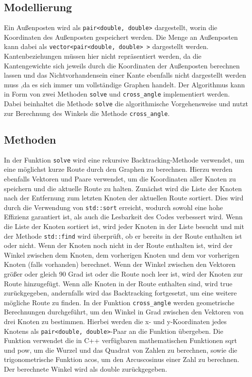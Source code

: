 \documentclass[a4paper,10pt,ngerman]{scrartcl}
\begin{document}
    \subsection{Modellierung}\label{subsec:modellierung}
    Ein Außenposten wird als \texttt{pair<double, double>} dargestellt, worin die Koordinaten des Außenposten gespeichert werden.
    Die Menge an Außenposten kann dabei als \texttt{vector<pair<double, double> >} dargestellt werden.
    Kantenbeziehungen müssen hier nicht repräsentiert werden, da die Kantengewichte sich jeweils durch die Koordinaten der Außenposten berechnen lassen
    und das Nichtvorhandensein einer Kante ebenfalls nicht dargestellt werden muss ,da es sich immer um vollständige Graphen handelt.
    Der Algorithmus kann in Form von zwei Methoden \texttt{solve} und \texttt{cross\_angle} implementiert werden.
    Dabei beinhaltet die Methode \texttt{solve} die algorithmische Vorgehensweise und nutzt zur Berechnung des Winkels die Methode \texttt{cross\_angle}.
    \subsection{Methoden}\label{subsec:methoden}
    In der Funktion \texttt{solve} wird eine rekursive Backtracking-Methode verwendet, um eine möglichst kurze Route durch den Graphen zu berechnen.
    Hierzu werden ebenfalls Vektoren und Paare verwendet, um die Koordinaten aller Knoten zu speichern und die aktuelle Route zu halten.
    Zunächst wird die Liste der Knoten nach der Entfernung zum letzten Knoten der aktuellen Route sortiert.
    Dies wird durch die Verwendung von \texttt{std::sort} erreicht, wodurch sowohl eine hohe Effizienz garantiert ist,
    als auch die Lesbarkeit des Codes verbessert wird.
    Wenn die Liste der Knoten sortiert ist, wird jeder Knoten in der Liste besucht und mit der Methode \texttt{std::find} wird überprüft,
    ob er bereits in der Route enthalten ist oder nicht.
    Wenn der Knoten noch nicht in der Route enthalten ist, wird der Winkel zwischen dem Knoten, dem vorherigen Knoten und dem vor vorherigen Knoten (falls vorhanden) berechnet.
    Wenn der Winkel zwischen den Vektoren größer oder gleich 90 Grad ist oder die Route noch leer ist, wird der Knoten zur Route hinzugefügt.
    Wenn alle Knoten in der Route enthalten sind, wird true zurückgegeben, andernfalls wird das Backtracking fortgesetzt, um eine weitere mögliche Route zu finden.
    \newline
    In der Funktion \texttt{cross\_angle} werden geometrische Berechnungen durchgeführt, um den Winkel in Grad zwischen den Vektoren von drei Knoten zu bestimmen.
    Hierbei werden die x- und y-Koordinaten jedes Knotens als \texttt{pair<double, double>}-Paar an die Funktion übergeben.
    Die Funktion verwendet die in C++ verfügbaren mathematischen Funktionen sqrt und pow, um die Wurzel und das Quadrat von Zahlen zu berechnen,
    sowie die trigonometrische Funktion acos, um den Arcuscosinus einer Zahl zu berechnen.
    Der berechnete Winkel wird als double zurückgegeben.
\end{document}
